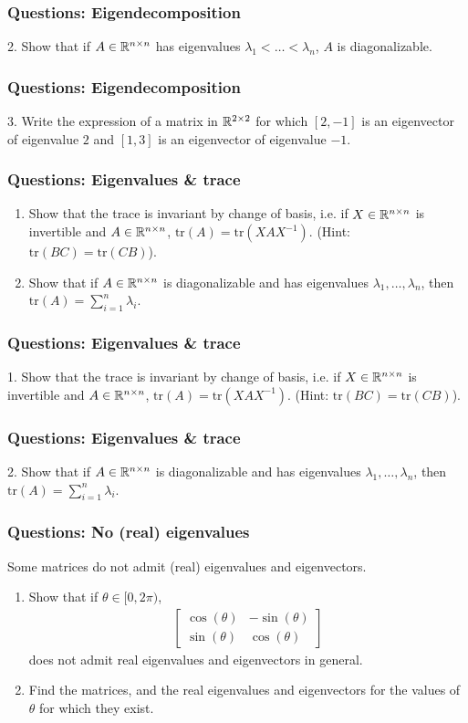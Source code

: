 \documentclass{beamer}
\begin{document}
\begin{frame}[t]
\frametitle{Questions: Eigendecomposition}
2. Show that if $A \in \mathbb{R}^{n \times n}$ has eigenvalues $\lambda_1 < \dots < \lambda_n$, $A$ is diagonalizable.
\end{frame}

\begin{frame}[t]
\frametitle{Questions: Eigendecomposition}
3. Write the expression of a matrix in $\mathbb{R}^{2 \times 2}$ for which $[2,-1]$ is an eigenvector of eigenvalue $2$ and $[1,3]$ is an eigenvector of eigenvalue $-1$.
\pause
\end{frame}

\begin{frame}[t]
\frametitle{Questions: Eigenvalues \& trace}
\begin{enumerate}
\item Show that the trace is invariant by change of basis, i.e. if $X \in \mathbb{R}^{n \times n}$ is invertible and $A \in \mathbb{R}^{n \times n}$, $\text{tr}(A) = \text{tr}(X A X^{-1})$. (Hint: $\text{tr}(BC) = \text{tr}(CB)$).
\item Show that if $A \in \mathbb{R}^{n \times n}$ is diagonalizable and has eigenvalues $\lambda_1, \dots, \lambda_n$, then $\text{tr}(A) = \sum_{i=1}^n \lambda_i$.
\end{enumerate}
\end{frame}

\begin{frame}[t]
\frametitle{Questions: Eigenvalues \& trace}
1. Show that the trace is invariant by change of basis, i.e. if $X \in \mathbb{R}^{n \times n}$ is invertible and $A \in \mathbb{R}^{n \times n}$, $\text{tr}(A) = \text{tr}(X A X^{-1})$. (Hint: $\text{tr}(BC) = \text{tr}(CB)$).
\pause
\end{frame}

\begin{frame}[t]
\frametitle{Questions: Eigenvalues \& trace}
2. Show that if $A \in \mathbb{R}^{n \times n}$ is diagonalizable and has eigenvalues $\lambda_1, \dots, \lambda_n$, then $\text{tr}(A) = \sum_{i=1}^n \lambda_i$.
\pause
\end{frame}

\begin{frame}[t]
\frametitle{Questions: No (real) eigenvalues}
Some matrices do not admit (real) eigenvalues and eigenvectors. 
\begin{enumerate}
\item Show that if $\theta \in [0,2\pi)$,
\begin{align*}
\begin{bmatrix}
\cos(\theta) & -\sin(\theta) \\
\sin(\theta) & \cos(\theta)
\end{bmatrix}
\end{align*}
does not admit real eigenvalues and eigenvectors in general.
\item Find the matrices, and the real eigenvalues and eigenvectors for the values of $\theta$ for which they exist.
\end{enumerate}
\end{frame}
\end{document}
